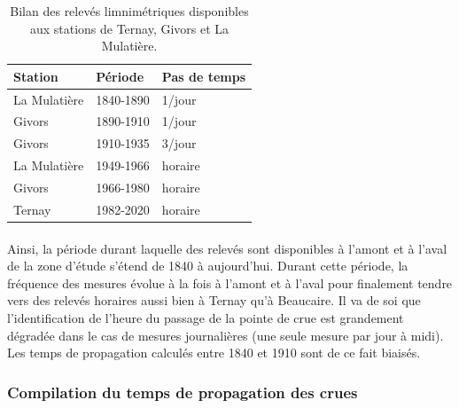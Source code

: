 	\begin{table}[h]
	\centering
	\caption{Bilan des relevés limnimétriques disponibles aux stations de Ternay, Givors et La Mulatière.}
	\label{tab:Hternay}
		\begin{tabular}{|l|l|l|}
			\hline
			Station      & Période   & Pas de temps \\ \hline
			La Mulatière & 1840-1890 & 1/jour       \\ \hline
			Givors       & 1890-1910 & 1/jour       \\ \hline
			Givors       & 1910-1935 & 3/jour       \\ \hline
			La Mulatière & 1949-1966 & horaire      \\ \hline
			Givors       & 1966-1980 & horaire      \\ \hline
			Ternay       & 1982-2020 & horaire      \\ \hline
		\end{tabular}
	\end{table}

	
	\paragraph{} Ainsi, la période durant laquelle des relevés sont disponibles à l'amont et à l'aval de la zone d'étude s'étend de 1840 à aujourd'hui. Durant cette période, la fréquence des mesures évolue à la fois à l'amont et à l'aval pour finalement tendre vers des relevés horaires aussi bien à Ternay qu'à Beaucaire. Il va de soi que l'identification de l'heure du passage de la pointe de crue est grandement dégradée dans le cas de mesures journalières (une seule mesure par jour à midi). Les temps de propagation calculés entre 1840 et 1910 sont de ce fait biaisés.
	
	
\FloatBarrier
	\subsubsection{Compilation du temps de propagation des crues}

	
